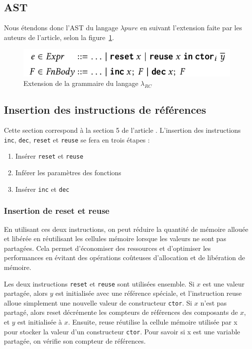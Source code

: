 \documentclass{rapportECL}
\begin{document}
\subsection{AST}

Nous étendons donc l'AST du langage $\lambda{pure}$ en suivant l'extension faite par les auteurs de l'article\cite{ullrich_counting_2020},
selon la figure~\ref{fig:grammaire RC}.

\begin{figure}[hbt!]
	\centering
	\includegraphics[scale=0.40]{logos/grammaire_RC.png}
	\caption{Extension de la grammaire du langage $\lambda_{RC}$}
	\label{fig:grammaire RC}
\end{figure}
\FloatBarrier 

\subsection{Insertion des instructions de références} \label{section:insert_inc_dec}

Cette section correspond à la section 5 de l'article \cite{ullrich_counting_2020}.
L'insertion des instructions \verb|inc|, \verb|dec|, \verb|reset| et \verb|reuse| se fera en trois étapes :
\begin{enumerate}
    \item Insérer \verb|reset| et \verb|reuse|
    \item Inférer les paramètres des fonctions
    \item Insérer \verb|inc| et \verb|dec|
\end{enumerate}

\subsubsection{Insertion de reset et reuse}
En utilisant ces deux instructions, on peut réduire la quantité de mémoire allouée et libérée en réutilisant les cellules mémoire lorsque les valeurs ne sont pas partagées. Cela permet d'économiser des ressources et d'optimiser les performances en évitant des opérations coûteuses d'allocation et de libération de mémoire.

Les deux instructions \verb|reset| et \verb|reuse| sont utilisées ensemble. Si $x$ est une valeur partagée, alors $y$ est initialisée avec une référence spéciale, et l'instruction reuse alloue simplement une nouvelle valeur de constructeur \verb|ctor|. 
Si $x$ n'est pas partagé, alors reset décrémente les compteurs de références des composants de $x$, et $y$ est initialisée à $x$. 
Ensuite, reuse réutilise la cellule mémoire utilisée par x pour stocker la valeur d'un constructeur \verb|ctor|. Pour savoir si x est une variable partagée, on vérifie son compteur de références.
\end{document}
